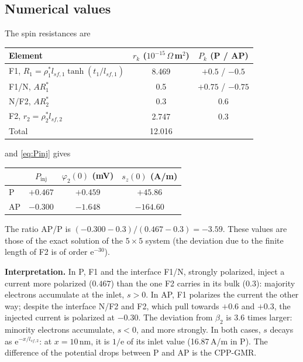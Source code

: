 \documentclass[11pt,a4paper]{article}
\newcommand{\ee}{\mathrm{e}}
\begin{document}
\subsection{Numerical values}

The spin resistances are
\begin{center}
\begin{tabular}{lcc}
  \toprule
  Element & $r_k$ ($10^{-15}\,\Omega\,$m$^2$) & $P_k$ (P / AP) \\
  \midrule
  F1, $R_1 = \rho_1^*l_{sf,1}\tanh(t_1/l_{sf,1})$ & 8.469 & $+0.5$ / $-0.5$ \\
  F1/N, $AR_1^*$ & 0.5 & $+0.75$ / $-0.75$ \\
  N/F2, $AR_2^*$ & 0.3 & 0.6 \\
  F2, $r_2 = \rho_2^*l_{sf,2}$ & 2.747 & 0.3 \\
  \midrule
  Total & 12.016 & \\
  \bottomrule
\end{tabular}
\end{center}
and \eqref{eq:Pinj} gives
\begin{center}
\renewcommand{\arraystretch}{1.2}
\begin{tabular}{lccc}
  \toprule
  & $P_{\mathrm{inj}}$ & $\varphi_2(0)$ (mV) & $s_z(0)$ (A/m) \\
  \midrule
  P  & $+0.467$ & $+0.459$ & $+45.86$ \\
  AP & $-0.300$ & $-1.648$ & $-164.60$ \\
  \bottomrule
\end{tabular}
\end{center}
The ratio AP/P is $(-0.300-0.3)/(0.467-0.3) = -3.59$. These values are
those of the exact solution of the $5\times5$ system (the deviation due to
the finite length of F2 is of order $\ee^{-30}$).

\textbf{Interpretation.} In P, F1 and the interface F1/N, strongly
polarized, inject a current more polarized ($0.467$) than the one F2
carries in its bulk ($0.3$): majority electrons accumulate at the inlet,
$s>0$. In AP, F1 polarizes the current the other way; despite the
interface N/F2 and F2, which pull towards $+0.6$ and $+0.3$, the injected
current is polarized at $-0.30$. The deviation from $\beta_2$ is 3.6 times
larger: minority electrons accumulate, $s<0$, and more strongly. In both
cases, $s$ decays as $\ee^{-x/l_{sf,2}}$: at $x = 10$\,nm, it is $1/\ee$
of its inlet value (16.87\,A/m in P). The difference of the potential
drops between P and AP is the CPP-GMR.
\end{document}
